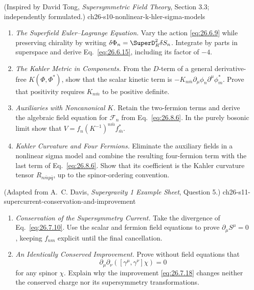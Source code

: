 \begin{enumerate}
    {(Inspired by David Tong, \emph{Supersymmetric Field Theory}, Section 3.3; independently formulated.)}
    {ch26-s10-nonlinear-k-hler-sigma-models}
  \begin{enumerate}
    \item \emph{The Superfield Euler--Lagrange Equation.}
    Vary the action \eqref{eq:26.6.9} while preserving chirality by writing
      \(\delta\Phi_n=\SuperD_R^2\delta S_n\).  Integrate by parts in superspace
      and derive Eq.~\eqref{eq:26.6.15}, including its factor of \(-4\).
    \item \emph{The Kahler Metric in Components.}
    From the \(D\)-term of a general derivative-free \(K(\Phi,\Phi^*)\),
      show that the scalar kinetic term is
      \(-K_{n\bar m}\partial_\mu\phi_n\partial^\mu\phi_m^*\).
      Prove that positivity requires \(K_{n\bar m}\) to be positive definite.
    \item \emph{Auxiliaries with Noncanonical \(K\).}
    Retain the two-fermion terms and derive the algebraic field equation for
      \(\mathcal F_n\) from Eq.~\eqref{eq:26.8.6}.  In the purely bosonic
      limit show that
      \(V=f_n(K^{-1})^{n\bar m}f_{\bar m}^*\).
    \item \emph{Kahler Curvature and Four Fermions.}
    Eliminate the auxiliary fields in a nonlinear sigma model and combine
      the resulting four-fermion term with the last term of
      Eq.~\eqref{eq:26.8.6}.  Show that its coefficient is the Kahler curvature
      tensor \(R_{n\bar m p\bar q}\), up to the spinor-ordering convention.
  \end{enumerate}

    {(Adapted from A.~C. Davis, \emph{Supergravity 1 Example Sheet}, Question 5.)}
    {ch26-s11-supercurrent-conservation-and-improvement}
  \begin{enumerate}
    \item \emph{Conservation of the Supersymmetry Current.}
    Take the divergence of Eq.~\eqref{eq:26.7.10}.  Use the scalar and
      fermion field equations to prove \(\partial_\mu S^\mu=0\), keeping
      \(f_{nm}\) explicit until the final cancellation.
    \item \emph{An Identically Conserved Improvement.}
    Prove without field equations that
      \[
        \partial_\mu\partial_\nu\!
          \left([\gamma^\mu,\gamma^\nu]\chi\right)=0
      \]
      for any spinor \(\chi\).  Explain why the improvement
      \eqref{eq:26.7.18} changes neither the conserved charge nor its
      supersymmetry transformations.
  \end{enumerate}


\end{enumerate}
